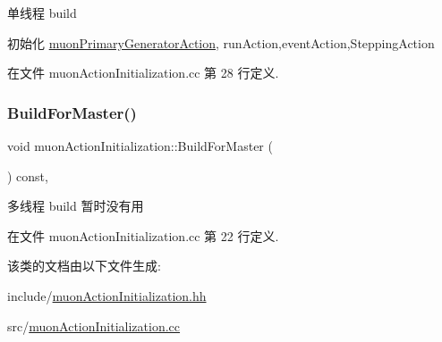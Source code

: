 单线程 build 

初始化 \hyperlink{classmuonPrimaryGeneratorAction}{muon\+Primary\+Generator\+Action}, run\+Action,event\+Action,Stepping\+Action 

在文件 muon\+Action\+Initialization.\+cc 第 28 行定义.

\mbox{\label{classmuonActionInitialization_a6819e8906b517d01966731ccbbac388d}} 
\subsubsection{\texorpdfstring{Build\+For\+Master()}{BuildForMaster()}}
{\footnotesize\ttfamily void muon\+Action\+Initialization\+::\+Build\+For\+Master (\begin{DoxyParamCaption}{ }\end{DoxyParamCaption}) const\hspace{0.3cm}{\ttfamily [override]}, {\ttfamily [virtual]}}



多线程 build 暂时没有用 



在文件 muon\+Action\+Initialization.\+cc 第 22 行定义.



该类的文档由以下文件生成\+:\begin{DoxyCompactItemize}
\item 
include/\hyperlink{muonActionInitialization_8hh}{muon\+Action\+Initialization.\+hh}\item 
src/\hyperlink{muonActionInitialization_8cc}{muon\+Action\+Initialization.\+cc}\end{DoxyCompactItemize}
